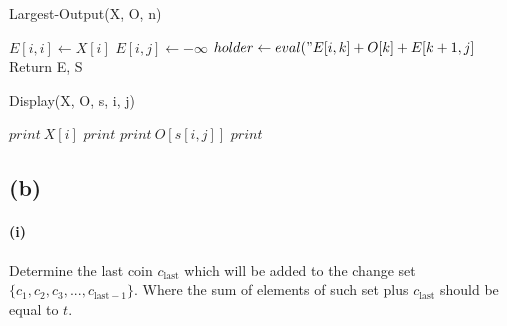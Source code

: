 \documentclass[11pt]{article}
\begin{document}
\begin{algorithm}[H]
\caption{Largest-Output(X, O, n)}
    \begin{algorithmic}[1]
        \State {}
            \State $E[i, i] \gets X[i]$ 
        \EndFor
                \State $E[i, j] \gets - \infty$
                    \State $holder \gets eval("E[i,k] + O[k] + E[k + 1, j]$
                    \EndIf
                \EndFor
            \EndFor
        \EndFor
    \State Return  E, S
    \end{algorithmic}
\end{algorithm}

\begin{algorithm}[H]
\caption{Display(X, O, s, i, j)}
    \begin{algorithmic}[1]
            \State $print \ X[i]$
        \Else
            \State $print $ 
            \State $print\  O[s[i, j]]$
            \State $print $ 
        \EndIf

    \end{algorithmic}
\end{algorithm}



\subsection{(b)}


\paragraph{(i)} Determine the last coin $c_{\text{last}}$ which will be added to the change set $\{c_1, c_2, c_3, ..., c_{\text{last}-1}\}$. Where the sum of elements of such set plus $c_{\text{last}}$ should be equal to $t$.
\end{document}
